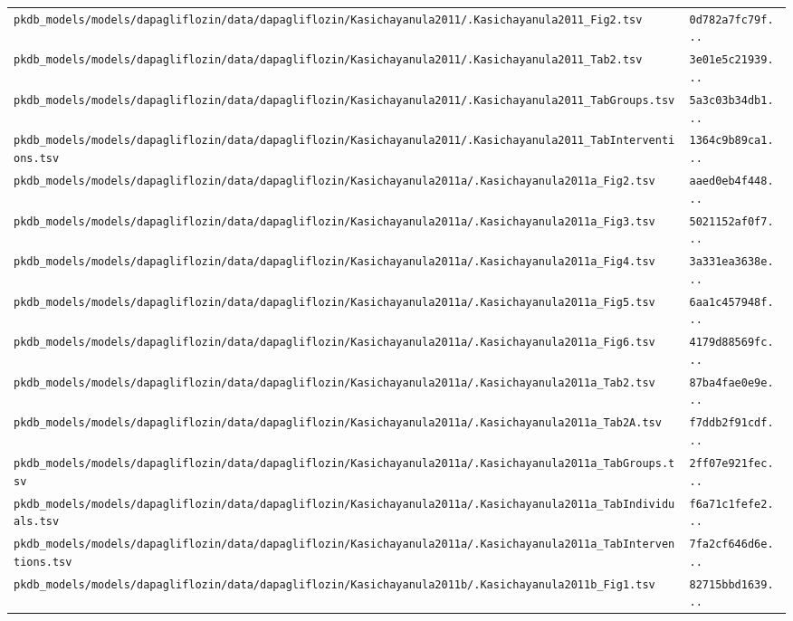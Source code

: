 \begin{longtable}{ll}
\texttt{pkdb\_models/models/dapagliflozin/data/dapagliflozin/Kasichayanula2011/.Kasichayanula2011\_Fig2.tsv} & \texttt{0d782a7fc79f...} \\
\texttt{pkdb\_models/models/dapagliflozin/data/dapagliflozin/Kasichayanula2011/.Kasichayanula2011\_Tab2.tsv} & \texttt{3e01e5c21939...} \\
\texttt{pkdb\_models/models/dapagliflozin/data/dapagliflozin/Kasichayanula2011/.Kasichayanula2011\_TabGroups.tsv} & \texttt{5a3c03b34db1...} \\
\texttt{pkdb\_models/models/dapagliflozin/data/dapagliflozin/Kasichayanula2011/.Kasichayanula2011\_TabInterventions.tsv} & \texttt{1364c9b89ca1...} \\
\texttt{pkdb\_models/models/dapagliflozin/data/dapagliflozin/Kasichayanula2011a/.Kasichayanula2011a\_Fig2.tsv} & \texttt{aaed0eb4f448...} \\
\texttt{pkdb\_models/models/dapagliflozin/data/dapagliflozin/Kasichayanula2011a/.Kasichayanula2011a\_Fig3.tsv} & \texttt{5021152af0f7...} \\
\texttt{pkdb\_models/models/dapagliflozin/data/dapagliflozin/Kasichayanula2011a/.Kasichayanula2011a\_Fig4.tsv} & \texttt{3a331ea3638e...} \\
\texttt{pkdb\_models/models/dapagliflozin/data/dapagliflozin/Kasichayanula2011a/.Kasichayanula2011a\_Fig5.tsv} & \texttt{6aa1c457948f...} \\
\texttt{pkdb\_models/models/dapagliflozin/data/dapagliflozin/Kasichayanula2011a/.Kasichayanula2011a\_Fig6.tsv} & \texttt{4179d88569fc...} \\
\texttt{pkdb\_models/models/dapagliflozin/data/dapagliflozin/Kasichayanula2011a/.Kasichayanula2011a\_Tab2.tsv} & \texttt{87ba4fae0e9e...} \\
\texttt{pkdb\_models/models/dapagliflozin/data/dapagliflozin/Kasichayanula2011a/.Kasichayanula2011a\_Tab2A.tsv} & \texttt{f7ddb2f91cdf...} \\
\texttt{pkdb\_models/models/dapagliflozin/data/dapagliflozin/Kasichayanula2011a/.Kasichayanula2011a\_TabGroups.tsv} & \texttt{2ff07e921fec...} \\
\texttt{pkdb\_models/models/dapagliflozin/data/dapagliflozin/Kasichayanula2011a/.Kasichayanula2011a\_TabIndividuals.tsv} & \texttt{f6a71c1fefe2...} \\
\texttt{pkdb\_models/models/dapagliflozin/data/dapagliflozin/Kasichayanula2011a/.Kasichayanula2011a\_TabInterventions.tsv} & \texttt{7fa2cf646d6e...} \\
\texttt{pkdb\_models/models/dapagliflozin/data/dapagliflozin/Kasichayanula2011b/.Kasichayanula2011b\_Fig1.tsv} & \texttt{82715bbd1639...} \\

\end{longtable}
